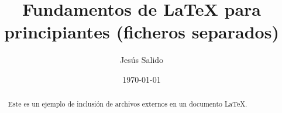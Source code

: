 \documentclass[11pt,a4paper]{article}
\author{Jesús Salido}
\title{Fundamentos de \LaTeX{} para principiantes (ficheros separados)}
\date{\today}
\begin{document}
\maketitle

\begin{abstract}
	Este es un ejemplo de inclusión de archivos externos en un documento \LaTeX.
\end{abstract}


\end{document}
